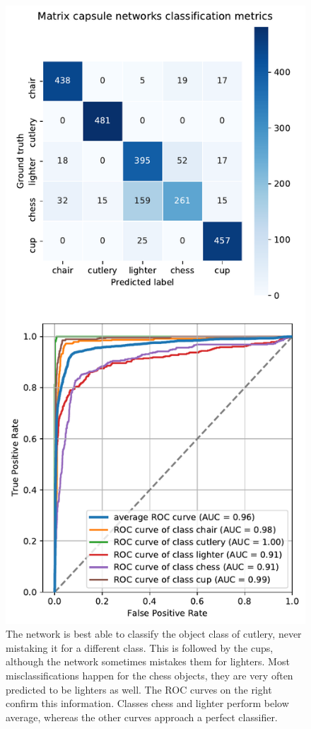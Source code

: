 \begin{figure}[H]
    \centering
\includegraphics[width=.59\textwidth]{figures/roc_matrix.pdf}
\caption[Classification metrics for the matrix capsule network]{The network is best able to classify the object class of cutlery, never mistaking it for a different class. This is followed by the cups, although the network sometimes mistakes them for lighters. Most misclassifications happen for the chess objects, they are very often predicted to be lighters as well. The ROC curves on the right confirm this information. Classes chess and lighter perform below average, whereas the other curves approach a perfect classifier.}\label{fig:roc-matrix}
\end{figure}\noindent
